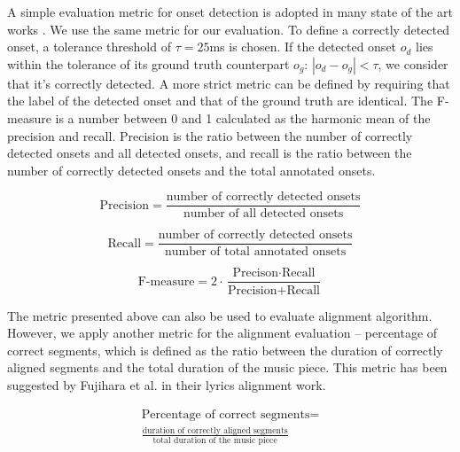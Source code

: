 A simple evaluation metric for onset detection is adopted in many state of the art works . We use the same metric for our evaluation. To define a correctly detected onset, a tolerance threshold of $\tau=25$ms is chosen. If the detected onset $o_d$ lies within the tolerance of its ground truth counterpart $o_g$: $|o_d-o_g|<\tau$, we consider that it's correctly detected. A more strict metric can be defined by requiring that the label of the detected onset and that of the ground truth are identical. The F-measure is a number between 0 and 1 calculated as the harmonic mean of the precision and recall. Precision is the ratio between the number of correctly detected onsets and all detected onsets, and recall is the ratio between the number of correctly detected onsets and the total annotated onsets.  

\begin{equation}
\textrm{Precision} = \frac{\textrm{number of correctly detected onsets}}{\textrm{number of all detected onsets}}
\end{equation}

\begin{equation}
\textrm{Recall} = \frac{\textrm{number of correctly detected onsets}}{\textrm{number of total annotated onsets}}
\end{equation}

\begin{equation}
\textrm{F-measure} = 2 \cdot \frac{\textrm{Precison} \cdot \textrm{Recall}}{\textrm{Precision} + \textrm{Recall}}
\end{equation}

The metric presented above can also be used to evaluate alignment algorithm. However, we apply another metric for the alignment evaluation -- percentage of correct segments, which is defined as the ratio between the duration of correctly aligned segments and the total duration of the music piece. This metric has been suggested by Fujihara et al.  in their lyrics alignment work.

\begin{equation}
\begin{split}
\textrm{Percentage of correct segments} =\\\frac{\textrm{duration of correctly aligned segments}}{\textrm{total duration of the music piece}}
\end{split}
\end{equation}

